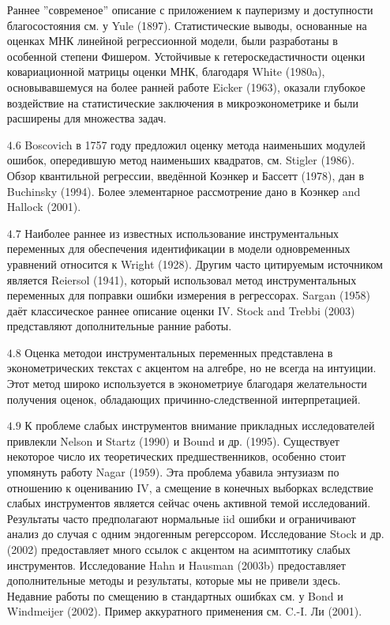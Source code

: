 \begin{itemize}
Раннее ''современое'' описание с приложением к пауперизму и доступности благосостояния см. у Yule (1897). Статистические выводы, основанные на оценках МНК линейной регрессионной модели, были разработаны в особенной степени Фишером. Устойчивые к гетероскедастичности оценки ковариационной матрицы оценки МНК, благодаря White (1980a), основывавшемуся на более ранней работе Eicker (1963), оказали глубокое воздействие на статистические заключения в микроэконометрике и были расширены для множества задач.
\item [$4.6$] Boscovich в 1757 году предложил оценку метода наименьших модулей ошибок, опередившую метод наименьших квадратов, см. Stigler (1986). Обзор квантильной регрессии, введённой Коэнкер и
Бассетт (1978), дан в Buchinsky (1994). Более элементарное рассмотрение дано в Коэнкер and Hallock (2001).
\item [$4.7$] Наиболее раннее из известных использование инструментальных переменных для обеспечения идентификации в модели одновременных уравнений относится к  Wright (1928). Другим часто цитируемым источником является Reiersol (1941), который использовал метод инструментальных переменных для поправки ошибки измерения в регрессорах. Sargan (1958) даёт классическое раннее описание оценки IV.  Stock and
Trebbi (2003) представляют дополнительные ранние работы.
\item [$4.8$] Оценка методои инструментальных переменных представлена в эконометрических текстах с акцентом на алгебре, но не всегда на интуиции. Этот метод широко используется в эконометриуе благодаря желательности получения оценок, обладающих причинно-следственной интерпретацией.
\item [$4.9$] К проблеме слабых инструментов внимание прикладных исследователей привлекли Nelson и Startz (1990) и Bound и др. (1995). Существует некоторое число их теоретических предшественников, особенно стоит упомянуть работу Nagar (1959). Эта проблема убавила энтузиазм по отношению к оцениванию IV, а смещение в конечных выборках вследствие слабых инструментов является сейчас очень активной темой исследований. Результаты часто предполагают нормальные iid ошибки и ограничивают анализ до случая с одним эндогенным регерссором. Исследование Stock и др.(2002)  предоставляет много ссылок с акцентом на асимптотику слабых инструментов. Исследование Hahn и Hausman (2003b) предоставляет дополнительные методы и результаты, которые мы не привели здесь. Недавние работы по смещению в стандартных ошибках см. у Bond и Windmeijer (2002). Пример аккуратного применения см. C.-I. Ли (2001).
\end{itemize}

